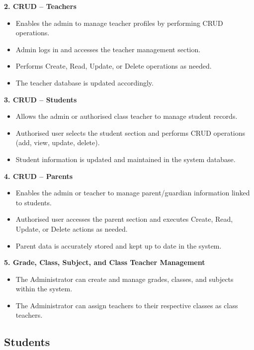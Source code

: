\documentclass[12pt, a4paper]{report}
\begin{document}
\textbf{2. CRUD -- Teachers}
\begin{itemize}
    \item Enables the admin to manage teacher profiles by performing CRUD operations.
    \item Admin logs in and accesses the teacher management section.
    \item Performs Create, Read, Update, or Delete operations as needed.
    \item The teacher database is updated accordingly.
\end{itemize}

\textbf{3. CRUD -- Students}
\begin{itemize}
    \item Allows the admin or authorised class teacher to manage student records.
    \item Authorised user selects the student section and performs CRUD operations (add, view, update, delete).
    \item Student information is updated and maintained in the system database.
\end{itemize}

\textbf{4. CRUD -- Parents}
\begin{itemize}
    \item Enables the admin or teacher to manage parent/guardian information linked to students.
    \item Authorised user accesses the parent section and executes Create, Read, Update, or Delete actions as needed.
    \item Parent data is accurately stored and kept up to date in the system.
\end{itemize}

\textbf{5. Grade, Class, Subject, and Class Teacher Management}
\begin{itemize}
    \item The Administrator can create and manage grades, classes, and subjects within the system.
    \item The Administrator can assign teachers to their respective classes as class teachers.
\end{itemize}

\subsection{Students}
\end{document}
